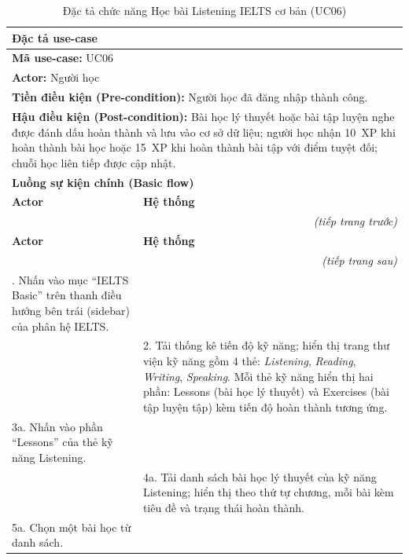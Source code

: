 \begin{longtable}{|p{\tbu}|p{\tbu}|}
    \caption{Đặc tả chức năng Học bài Listening IELTS cơ bản (UC06)} \label{tab:uc06_spec} \\
    
    \hline
    \multicolumn{2}{|l|}{\textbf{Đặc tả use-case}} \\ \hline
    \multicolumn{2}{|l|}{\textbf{Mã use-case:} UC06} \\ \hline
    \multicolumn{2}{|l|}{\textbf{Actor:} Người học} \\ \hline
    \multicolumn{2}{|p{\dimexpr\linewidth - 2\tabcolsep - 2\arrayrulewidth\relax}|}{\textbf{Tiền điều kiện (Pre-condition):} Người học đã đăng nhập thành công.} \\ \hline
    \multicolumn{2}{|p{\dimexpr\linewidth - 2\tabcolsep - 2\arrayrulewidth\relax}|}{\textbf{Hậu điều kiện (Post-condition):} Bài học lý thuyết hoặc bài tập luyện nghe được đánh dấu hoàn thành và lưu vào cơ sở dữ liệu; người học nhận 10~XP khi hoàn thành bài học hoặc 15~XP khi hoàn thành bài tập với điểm tuyệt đối; chuỗi học liên tiếp được cập nhật.} \\ \hline
    \multicolumn{2}{|l|}{\textbf{Luồng sự kiện chính (Basic flow)}} \\ \hline
    \textbf{Actor} & \textbf{Hệ thống} \\ \hline
    \endfirsthead
    \multicolumn{2}{r}{\textit{(tiếp trang trước)}} \\
    \hline
    \textbf{Actor} & \textbf{Hệ thống} \\ \hline
    \endhead
    \hline
    \multicolumn{2}{r}{\textit{(tiếp trang sau)}} \\
    \endfoot
    \endlastfoot
    1. Nhấn vào mục ``IELTS Basic'' trên thanh điều hướng bên trái (sidebar) của phân hệ IELTS. & \\ \hline
    & 2. Tải thống kê tiến độ kỹ năng; hiển thị trang thư viện kỹ năng gồm 4 thẻ: \textit{Listening}, \textit{Reading}, \textit{Writing}, \textit{Speaking}. Mỗi thẻ kỹ năng hiển thị hai phần: Lessons (bài học lý thuyết) và Exercises (bài tập luyện tập) kèm tiến độ hoàn thành tương ứng. \\ \hline
    3a. Nhấn vào phần ``Lessons'' của thẻ kỹ năng Listening. & \\ \hline
    & 4a. Tải danh sách bài học lý thuyết của kỹ năng Listening; hiển thị theo thứ tự chương, mỗi bài kèm tiêu đề và trạng thái hoàn thành. \\ \hline
    5a. Chọn một bài học từ danh sách. & \\ \hline

\end{longtable}
